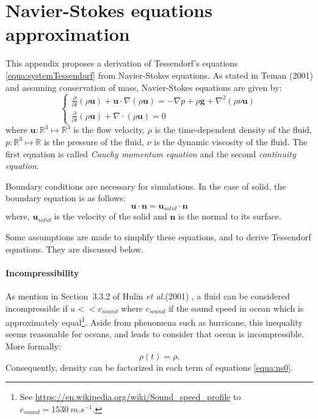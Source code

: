 \documentclass[final]{jcgt}
\def\etal{\emph{et al.}\xspace}
\begin{document}
\section{Navier-Stokes equations approximation}\label{sec:annexe-NS}
This appendix proposes a derivation of Tessendorf's equations \ref{equa:systemTessendorf} from Navier-Stokes equations. As stated in Teman (2001) \cite{temamNavierStokesEquations2001} and assuming conservation of mass, Navier-Stokes equations are given by:
\begin{equation}
	\begin{cases}
		\frac{\partial}{\partial t}\left(\rho \mathbf{u}\right) + \mathbf{u} \cdot \nabla (\rho \mathbf{u}) = - \nabla p + \rho\mathbf{g} +  \nabla^2 (\rho\nu \mathbf{u}) \\
		\frac{\partial}{\partial t}\left(\rho \mathbf{u}\right) + \nabla\cdot (\rho\mathbf{u}) = 0
	\end{cases}
	\label{equa:ns0}
\end{equation}
where $\mathbf{u} :\mathbb{R}^3\mapsto \mathbb{R}^3$ is the flow velocity, $\rho$ is the time-dependent density of the fluid, $p: \mathbb{R}^3\mapsto \mathbb{R}$ is the pressure of the fluid, $\nu$ is the dynamic viscosity of the fluid.
The first equation is called \emph{Cauchy momentum equation} and the second \emph{continuity equation}.

Boundary conditions are necessary for simulations. In the case of solid, the boundary equation is as follows:
\begin{equation}
	\mathbf{u}\cdot\mathbf{n} = \mathbf{u}_{solid} \cdot \mathbf{n}
\end{equation}
where, $\mathbf{u}_{solid}$ is the velocity of the solid and $\mathbf{n}$ is the normal to its surface.

Some assumptions are made to simplify these equations, and to derive Tessendorf equations.
They are discussed below.

\paragraph{Incompressibility}
As mention in Section~3.3.2 of Hulin \etal (2001) \cite{hulinHydrodynamiquePhysique2001}, a fluid can be considered incompressible if $u<<c_{sound}$ where $c_{sound}$ if the sound speed in ocean which is approximately equal\footnote{See \url{https://en.wikipedia.org/wiki/Sound_speed_profile} to $c_{sound} = 1530~m.s^{-1}$.}.
Aside from phenomena such as hurricane, this inequality seems reasonable for oceans, and leads to consider that ocean is incompressible.
More formally:
\begin{equation}
	\rho(t)=\rho.
\end{equation}
Consequently, density can be factorized in each term of equations \ref{equa:ns0}.
\end{document}
